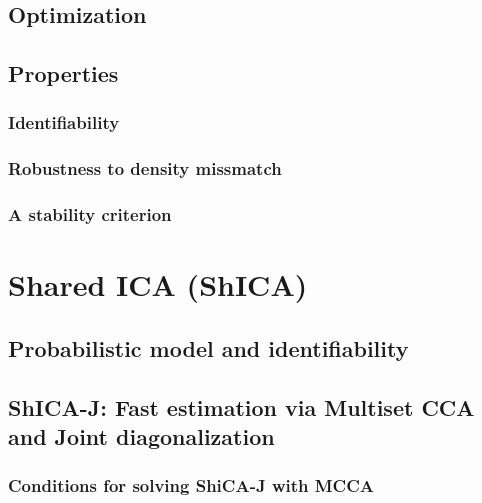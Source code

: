 \documentclass[12pt]{report}
\begin{document}
\subsection{Optimization}
\subsection{Properties}
\subsubsection{Identifiability}
\subsubsection{Robustness to density missmatch}
\subsubsection{A stability criterion}
\section{Shared ICA (ShICA)}
\subsection{Probabilistic model and identifiability}
\subsection{ShICA-J: Fast estimation via Multiset CCA and Joint diagonalization}
\subsubsection{Conditions for solving ShiCA-J with MCCA}
\end{document}
